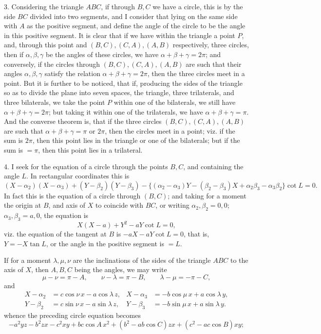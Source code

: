 \documentclass[11pt,a4paper]{article}
\begin{document}
3. Considering the triangle $ABC$, if through $B,C$ we have a circle, this is by the side $BC$ divided into two segments, and I consider that lying on the same side with $A$ as the positive segment, and define the angle of the circle to be the angle in this positive segment. It is clear that if we have within the triangle a point $P$, and, through this point and $(B,C),(C,A),(A,B)$ respectively, three circles, then if $\alpha,\beta,\gamma$ be the angles of these circles, we have $\alpha+\beta+\gamma=2\pi$; and conversely, if the circles through $(B,C),(C,A),(A,B)$ are such that their angles $\alpha,\beta,\gamma$ satisfy the relation $\alpha+\beta+\gamma=2\pi$, then the three circles meet in a point. But it is further to be noticed, that if, producing the sides of the triangle so as to divide the plane into seven spaces, the triangle, three trilaterals, and three bilaterals, we take the point $P$ within one of the bilaterals, we still have $\alpha+\beta+\gamma=2\pi$; but taking it within one of the trilaterals, we have $\alpha+\beta+\gamma=\pi$. And the converse theorem is, that if the three circles $(B,C),(C,A),(A,B)$ are such that $\alpha+\beta+\gamma=\pi$ or $2\pi$, then the circles meet in a point; viz. if the sum is $2\pi$, then this point lies in the triangle or one of the bilaterals; but if the sum is $=\pi$, then this point lies in a trilateral.

4. I seek for the equation of a circle through the points $B,C$, and containing the angle $L$. In rectangular coordinates this is
\[
(X-\alpha_2)(X-\alpha_3)+(Y-\beta_2)(Y-\beta_3)
-\{(\alpha_2-\alpha_3)Y-(\beta_2-\beta_3)X+\alpha_2\beta_3-\alpha_3\beta_2\}\cot L=0.
\]
In fact this is the equation of a circle through $(B,C)$; and taking for a moment the origin at $B$, and axis of $X$ to coincide with $BC$, or writing $\alpha_2,\beta_2=0,0$; $\alpha_3,\beta_3=a,0$, the equation is
\[
X(X-a)+Y^2-aY\cot L=0,
\]
viz. the equation of the tangent at $B$ is $-aX-aY\cot L=0$, that is, $Y=-X\tan L$, or the angle in the positive segment is $=L$.

If for a moment $\lambda,\mu,\nu$ are the inclinations of the sides of the triangle $ABC$ to the axis of $X$, then $A,B,C$ being the angles, we may write
\[
\mu-\nu=\pi-A,\qquad \nu-\lambda=\pi-B,\qquad \lambda-\mu=-\pi-C,
\]
and
\begin{align*}
X-\alpha_2&=c\cos\nu\,x-a\cos\lambda\,z,&
X-\alpha_3&=-b\cos\mu\,x+a\cos\lambda\,y,\\
Y-\beta_2&=c\sin\nu\,x-a\sin\lambda\,z,&
Y-\beta_3&=-b\sin\mu\,x+a\sin\lambda\,y.
\end{align*}
whence the preceding circle equation becomes
\[
-a^2yz-b^2zx-c^2xy+bc\cos A\,x^2+(b^2-ab\cos C)zx+(c^2-ac\cos B)xy;
\]
\end{document}
